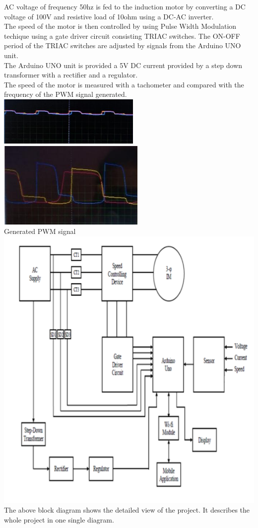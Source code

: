 AC voltage of frequency 50hz is fed to the induction motor by converting a DC voltage of 100V and resistive load of 10ohm using a DC-AC inverter.\\ 
The speed of the motor is then controlled by using Pulse Width Modulation techique using a gate driver circuit consisting TRIAC switches. The ON-OFF period of the TRIAC switches are adjusted by signals from the Arduino UNO unit.\\ 
The Arduino UNO unit is provided a 5V DC current provided by a step down transformer with a rectifier and a regulator.\\ 
The speed of the motor is measured with a tachometer and compared with the frequency of the PWM signal generated.\\
{\includegraphics[height=0.18\textheight]{Figures/g1.png}}
\\
{\includegraphics[height=0.2\textheight]{Figures/g2.png}}
\\
Generated PWM signal
\\
{\includegraphics[height=0.4\textheight]{Figures/g3.png}}
The above block diagram shows the detailed view of the project. It describes the whole project in one single diagram.






